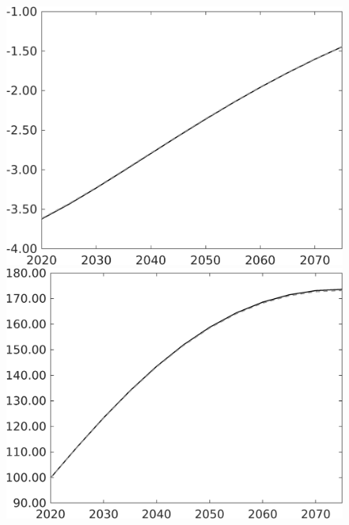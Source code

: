 \documentclass[12pt]{article}
\begin{document}
\begin{figure}[h!!]
\begin{minipage}[]{0.32\textwidth}
	\end{minipage}	
	\begin{minipage}[]{0.32\textwidth}
		\includegraphics[width=1\textwidth]{../../codding_model/own_basedOnFried/optimalPol_010922_revision/figures/all_13Sept22/PerdifNoTauf_Equlab_regime0_CompTaul_pn_spillover0_nsk0_xgr0_knspil1_sep1_LFlimit0_emsbase0_countec0_GovRev0_etaa0.79_lgd0.png}
	\end{minipage}	
	\begin{minipage}[]{0.32\textwidth}
		\includegraphics[width=1\textwidth]{../../codding_model/own_basedOnFried/optimalPol_010922_revision/figures/all_13Sept22/PerdifNoTauf_Equlab_regime0_CompTaul_pepn_spillover0_nsk0_xgr0_knspil1_sep1_LFlimit0_emsbase0_countec0_GovRev0_etaa0.79_lgd0.png}

\end{minipage}
\end{figure}
\end{document}
